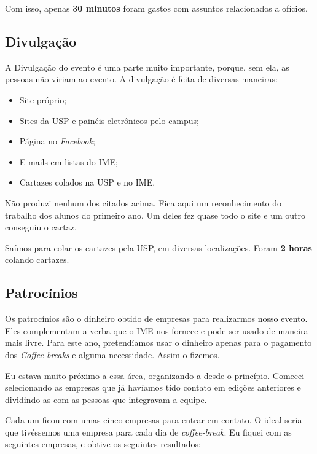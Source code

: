 \documentclass[12pt,letterpaper]{article}
\begin{document}
	Com isso, apenas \textbf{30 minutos} foram gastos com assuntos relacionados a ofícios.
	
	\subsection{Divulgação}
	
	A Divulgação do evento é uma parte muito importante, porque, sem ela, as pessoas não viriam ao evento. A divulgação é feita de diversas maneiras:
	
	\begin{itemize}
		\item Site próprio;
		\item Sites da USP e painéis eletrônicos pelo campus;
		\item Página no \textit{Facebook};
		\item E-mails em listas do IME;
		\item Cartazes colados na USP e no IME.
	\end{itemize}

	Não produzi nenhum dos citados acima. Fica aqui um reconhecimento do trabalho dos alunos do primeiro ano. Um deles fez quase todo o site e um outro conseguiu o cartaz. 
	
	Saímos para colar os cartazes pela USP, em diversas localizações\cite{cartazes}. Foram \textbf{2 horas} colando cartazes. 
	
	\subsection{Patrocínios}
	
	Os patrocínios são o dinheiro obtido de empresas para realizarmos nosso evento. Eles complementam a verba que o IME nos fornece e pode ser usado de maneira mais livre. Para este ano, pretendíamos usar o dinheiro apenas para o pagamento dos \textit{Coffee-breaks} e alguma necessidade. Assim o fizemos. 
	
	Eu estava muito próximo a essa área, organizando-a desde o princípio. Comecei selecionando as empresas que já havíamos tido contato em edições anteriores e dividindo-as com as pessoas que integravam a equipe. 
	
	Cada um ficou com umas cinco empresas para entrar em contato. O ideal seria que tivéssemos uma empresa para cada dia de \textit{coffee-break}. Eu fiquei com as seguintes empresas, e obtive os seguintes resultados:
	
\end{document}
